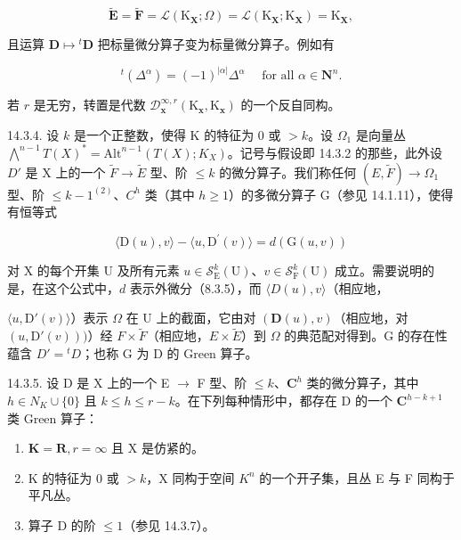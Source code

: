 \[
\tilde {\mathbf {E}} = \tilde {\mathbf {F}} = \mathcal {L} (\mathrm{K}_{\mathbf{X}}; \Omega) = \mathcal {L} (\mathrm{K}_{\mathbf{X}}; \mathrm{K}_{\mathbf{X}}) = \mathrm{K}_{\mathbf{X}},
\]

且运算 \(\mathbf{D} \mapsto {}^{t}\mathbf{D}\) 把标量微分算子变为标量微分算子。例如有

\[
{ } ^ { t } ( \Delta ^ { \alpha } ) = ( - 1 ) ^ { | \alpha | } \Delta ^ { \alpha } \quad \text { for all } \alpha \in \mathbf {N} ^ { n } .
\]

若 \(r\) 是无穷，转置是代数 \(\mathcal{D}_{\mathbf{x}}^{\infty,r}(\mathrm{K}_{\mathbf{x}},\mathrm{K}_{\mathbf{x}})\) 的一个反自同构。

14.3.4. 设 \(k\) 是一个正整数，使得 K 的特征为 0 或 \(>k\)。设 \(\Omega_{1}\) 是向量丛 \(\bigwedge^{n-1}T(X)^{*} = \text{Alt}^{n-1}(T(X); K_{X})\)。记号与假设即 14.3.2 的那些，此外设 \(D'\) 是 X 上的一个 \(\widetilde{F} \to \widetilde{E}\) 型、阶 \(\leqslant k\) 的微分算子。我们称任何 \((E, \widetilde{F}) \to \Omega_{1}\) 型、阶 \(\leqslant k - 1^{(2)}\)、\(C^{h}\) 类（其中 \(h \geqslant 1\)）的多微分算子 G（参见 14.1.11），使得有恒等式

\[
\langle \mathrm{D} (u), v \rangle - \langle u, \mathrm{D} ^ {\prime} (v) \rangle = d (\mathrm{G} (u, v))\tag{1}
\]

对 X 的每个开集 U 及所有元素 \(u \in \mathcal{S}_{\mathrm{E}}^{k}(\mathrm{U})\)、\(v \in \mathcal{S}_{\mathrm{F}}^{k}(\mathrm{U})\) 成立。需要说明的是，在这个公式中，\(d\) 表示外微分（8.3.5），而 \(\langle D(u), v \rangle\)（相应地，

\(\langle u, \mathrm{D}'(v) \rangle\)）表示 \(\Omega\) 在 U 上的截面，它由对 \((\mathbf{D}(u), v)\)（相应地，对 \((u, \mathrm{D}'(v)))\)）经 \(F \times \tilde{F}\)（相应地，\(E \times \tilde{E}\)）到 \(\Omega\) 的典范配对得到。G 的存在性蕴含 \(D' = {}^t D\)；也称 G 为 D 的 Green 算子。

14.3.5. 设 D 是 X 上的一个 E \(\to\) F 型、阶 \(\leqslant k\)、\(\mathbf{C}^{h}\) 类的微分算子，其中 \(h \in N_{K} \cup \{0\}\) 且 \(k \leqslant h \leqslant r-k\)。在下列每种情形中，都存在 D 的一个 \(\mathbf{C}^{h-k+1}\) 类 Green 算子：

\begin{enumerate}
\def\labelenumi{\alph{enumi})}
\item
  \(\mathbf{K} = \mathbf{R}, r = \infty\) 且 X 是仿紧的。
\item
  K 的特征为 0 或 \(>k\)，X 同构于空间 \(K^{n}\) 的一个开子集，且丛 E 与 F 同构于平凡丛。
\item
  算子 D 的阶 \(\leqslant1\)（参见 14.3.7）。
\end{enumerate}

